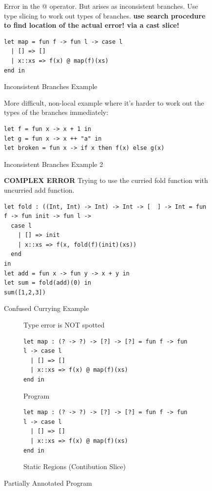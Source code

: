 \begin{figure}[h]
Error in the @ operator. But arises as inconsistent branches. Use type slicing to work out types of branches. \textbf{use search procedure to find location of the actual error! via a cast slice!}
\begin{lstlisting}
let map = fun f -> fun l -> case l 
  | [] => []
  | x::xs => f(x) @ map(f)(xs)
end in  
\end{lstlisting}
\caption{Inconsistent Branches Example}
\end{figure}

\begin{figure}
More difficult, non-local example where it's harder to work out the types of the branches immediately:
\begin{lstlisting}
let f = fun x -> x + 1 in
let g = fun x -> x ++ "a" in 
let broken = fun x -> if x then f(x) else g(x)
\end{lstlisting}
\caption{Inconsistent Branches Example 2}
\end{figure}

\begin{figure}
\textbf{COMPLEX ERROR}
Trying to use the curried fold function with uncurried add function.
\begin{lstlisting}
let fold : ((Int, Int) -> Int) -> Int -> [  ] -> Int = fun f -> fun init -> fun l -> 
  case l 
    | [] => init 
	| x::xs => f(x, fold(f)(init)(xs)) 
  end 
in
let add = fun x -> fun y -> x + y in
let sum = fold(add)(0) in
sum([1,2,3])
\end{lstlisting}
\caption{Confused Currying Example}
\label{fig:TastyCurry}
\end{figure}


\begin{figure}
\begin{subfigure}{.5\textwidth}
\centering
Type error is NOT spotted
\begin{lstlisting}
let map : (? -> ?) -> [?] -> [?] = fun f -> fun l -> case l 
  | [] => []
  | x::xs => f(x) @ map(f)(xs) 
end in   
\end{lstlisting}
\caption{Program}
\end{subfigure}

\begin{subfigure}{.5\textwidth}\centering
\begin{lstlisting}
let map : (? -> ?) -> [?] -> [?] = fun f -> fun l -> case l 
  | [] => []
  | x::xs => f(x) @ map(f)(xs) 
end in   
\end{lstlisting}
\caption{Static Regions (Contibution Slice)}
\end{subfigure}
\caption{Partially Annotated Program}
\label{fig:HalfAnnotated}
\end{figure}

